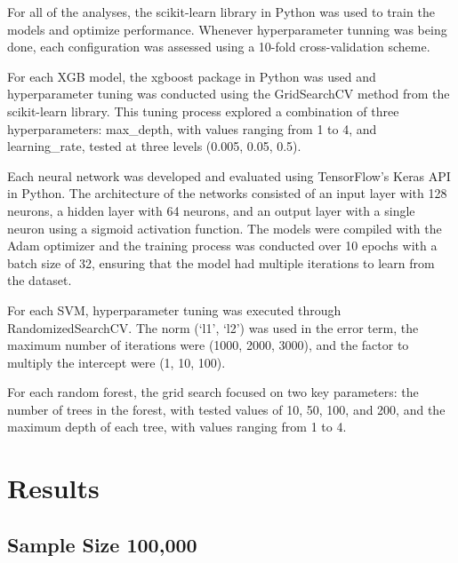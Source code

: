 \documentclass[
  man]{apa7}
\begin{document}
For all of the analyses, the scikit-learn library in Python was used to train the models and optimize performance. Whenever hyperparameter tunning was being done, each configuration was assessed using a 10-fold cross-validation scheme.

For each XGB model, the xgboost package in Python was used and hyperparameter tuning was conducted using the GridSearchCV method from the scikit-learn library. This tuning process explored a combination of three hyperparameters: max\_depth, with values ranging from 1 to 4, and learning\_rate, tested at three levels (0.005, 0.05, 0.5).

Each neural network was developed and evaluated using TensorFlow's Keras API in Python. The architecture of the networks consisted of an input layer with 128 neurons, a hidden layer with 64 neurons, and an output layer with a single neuron using a sigmoid activation function. The models were compiled with the Adam optimizer and the training process was conducted over 10 epochs with a batch size of 32, ensuring that the model had multiple iterations to learn from the dataset.

For each SVM, hyperparameter tuning was executed through RandomizedSearchCV. The norm (`l1', `l2') was used in the error term, the maximum number of iterations were (1000, 2000, 3000), and the factor to multiply the intercept were (1, 10, 100).

For each random forest, the grid search focused on two key parameters: the number of trees in the forest, with tested values of 10, 50, 100, and 200, and the maximum depth of each tree, with values ranging from 1 to 4.

\hypertarget{results}{%
\section{Results}\label{results}}

\hypertarget{sample-size-100000}{%
\subsection{Sample Size 100,000}\label{sample-size-100000}}
\end{document}
